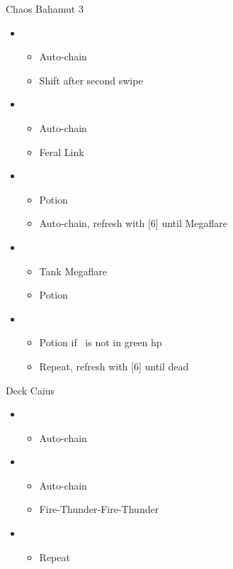 \begin{battle}{Chaos Bahamut 3}
	\begin{flushleft}
		\begin{itemize}
			\item \sixth
			      \begin{itemize}
				      \item Auto-chain
				      \item Shift after second swipe
			      \end{itemize}
			\item \second
			      \begin{itemize}
				      \item Auto-chain
				      \item Feral Link
			      \end{itemize}
			\item \sixth
			      \begin{itemize}
				      \item Potion
				      \item Auto-chain, refresh with [6] until Megaflare
			      \end{itemize}
			\item \fourth
			      \begin{itemize}
				      \item Tank Megaflare
				      \item Potion
			      \end{itemize}
			\item \fifth
			      \begin{itemize}
				      \item Potion if \chu\ is not in green hp
				      \item Repeat, refresh with [6] until dead
			      \end{itemize}
		\end{itemize}
	\end{flushleft}
\end{battle}

\begin{battle}{Deck Caius}
	\begin{flushleft}
		\begin{itemize}
			\item \sixth
			      \begin{itemize}
				      \item Auto-chain
			      \end{itemize}
			\item \fifth
			      \begin{itemize}
				      \item Auto-chain
				      \item Fire-Thunder-Fire-Thunder
			      \end{itemize}
			\item \sixth
			      \begin{itemize}
				      \item Repeat
			      \end{itemize}
		\end{itemize}
	\end{flushleft}
\end{battle}

